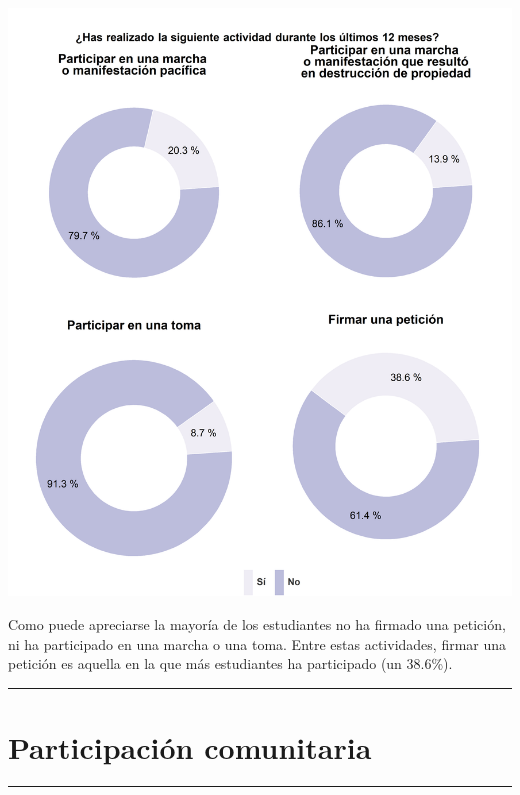 \documentclass[
  14pt,
]{book}
\let\origfigure\figure
\let\endorigfigure\endfigure
\renewenvironment{figure}[1][2] {
  \expandafter\origfigure\expandafter[H]
} {
  \endorigfigure
}
\begin{document}
\begin{figure}[!ht]

{\centering \includegraphics[width=0.8\linewidth,]{images/graph_partact} 

}

\caption{Participación activista fuera de la escuela}\label{fig:unnamed-chunk-55}
\end{figure}

Como puede apreciarse la mayoría de los estudiantes no ha firmado una petición, ni ha participado en una marcha o una toma. Entre estas actividades, firmar una petición es aquella en la que más estudiantes ha participado (un 38.6\%).

\begin{center}\rule{0.5\linewidth}{0.5pt}\end{center}

\hypertarget{participaciuxf3n-comunitaria}{%
\section{Participación comunitaria}\label{participaciuxf3n-comunitaria}}

\begin{center}\rule{0.5\linewidth}{0.5pt}\end{center}
\end{document}
